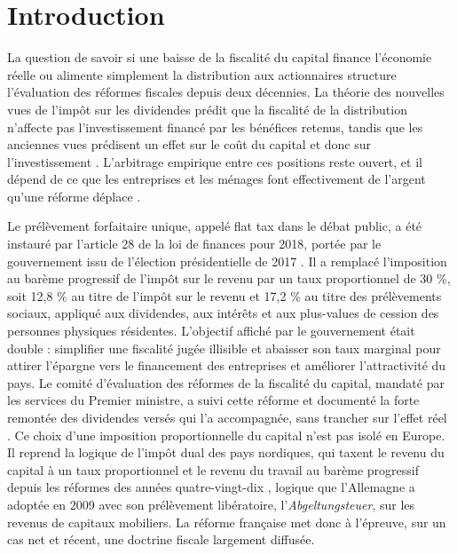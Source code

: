 \section{Introduction}

La question de savoir si une baisse de la fiscalité du capital finance l'économie réelle ou
alimente simplement la distribution aux actionnaires structure l'évaluation des réformes fiscales
depuis deux décennies. La théorie des nouvelles vues de l'impôt sur les dividendes prédit que la
fiscalité de la distribution n'affecte pas l'investissement financé par les bénéfices retenus,
tandis que les anciennes vues prédisent un effet sur le coût du capital et donc sur
l'investissement \citep{auerbach1979,poterba1985,chetty2005}. L'arbitrage empirique entre ces
positions reste ouvert, et il dépend de ce que les entreprises et les ménages font effectivement de
l'argent qu'une réforme déplace \citep{hanlon2010}.

Le prélèvement forfaitaire unique, appelé flat tax dans le débat public, a été instauré par
l'article 28 de la loi de finances pour 2018, portée par le gouvernement issu de l'élection
présidentielle de 2017 \citep{loidefinances2018}. Il a remplacé l'imposition au barème progressif
de l'impôt sur le revenu par un taux proportionnel de 30 \%, soit 12,8 \% au titre de l'impôt sur le
revenu et 17,2 \% au titre des prélèvements sociaux, appliqué aux dividendes, aux intérêts et aux
plus-values de cession des personnes physiques résidentes. L'objectif affiché par le gouvernement
était double : simplifier une fiscalité jugée illisible et abaisser son taux marginal pour attirer
l'épargne vers le financement des entreprises et améliorer l'attractivité du pays. Le comité
d'évaluation des réformes de la fiscalité du capital, mandaté par les services du Premier ministre,
a suivi cette réforme et documenté la forte remontée des dividendes versés qui l'a accompagnée, sans
trancher sur l'effet réel \citep{francestrategie2023}. Ce choix d'une imposition proportionnelle du
capital n'est pas isolé en Europe. Il reprend la logique de l'impôt dual des pays nordiques, qui
taxent le revenu du capital à un taux proportionnel et le revenu du travail au barème progressif
depuis les réformes des années quatre-vingt-dix \citep{sorensen1994}, logique que l'Allemagne a
adoptée en 2009 avec son prélèvement libératoire, l'\textit{Abgeltungsteuer}, sur les revenus de
capitaux mobiliers. La réforme française met donc à l'épreuve, sur un cas net et récent, une
doctrine fiscale largement diffusée.

